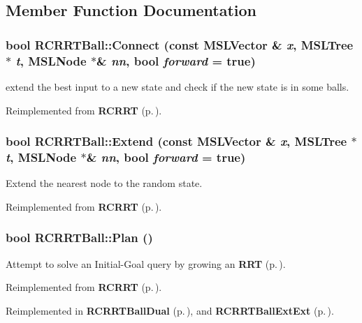 \subsection{Member Function Documentation}
\subsubsection{\setlength{\rightskip}{0pt plus 5cm}bool RCRRTBall::Connect (const {\bf MSLVector} \& {\em x}, {\bf MSLTree} $\ast$ {\em t}, {\bf MSLNode} $\ast$\& {\em nn}, bool {\em forward} = true)\hspace{0.3cm}{\tt  [virtual]}}\label{classRCRRTBall_a4}


extend the best input to a new state and check if the new state is in some balls.



Reimplemented from {\bf RCRRT} {\rm (p.\,\pageref{classRCRRT_a9})}.
\subsubsection{\setlength{\rightskip}{0pt plus 5cm}bool RCRRTBall::Extend (const {\bf MSLVector} \& {\em x}, {\bf MSLTree} $\ast$ {\em t}, {\bf MSLNode} $\ast$\& {\em nn}, bool {\em forward} = true)\hspace{0.3cm}{\tt  [virtual]}}\label{classRCRRTBall_a3}


Extend the nearest node to the random state.



Reimplemented from {\bf RCRRT} {\rm (p.\,\pageref{classRCRRT_a7})}.
\subsubsection{\setlength{\rightskip}{0pt plus 5cm}bool RCRRTBall::Plan ()\hspace{0.3cm}{\tt  [virtual]}}\label{classRCRRTBall_a5}


Attempt to solve an Initial-Goal query by growing an {\bf RRT} {\rm (p.\,\pageref{classRRT})}.



Reimplemented from {\bf RCRRT} {\rm (p.\,\pageref{classRCRRT_a10})}.

Reimplemented in {\bf RCRRTBall\-Dual} {\rm (p.\,\pageref{classRCRRTBallDual_a2})}, and {\bf RCRRTBall\-Ext\-Ext} {\rm (p.\,\pageref{classRCRRTBallExtExt_a2})}.
